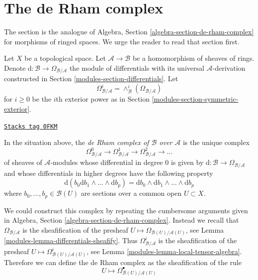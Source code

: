 \section{The de Rham complex}
\label{modules-section-de-rham-complex}
The section is the analogue of
Algebra, Section \ref{algebra-section-de-rham-complex} for morphisms of ringed
spaces. We urge the reader to read that section first.

\medskip\noindent
Let $X$ be a topological space. Let $\mathcal{A} \to \mathcal{B}$ be a
homomorphism of sheaves of rings. Denote
$\text{d} : \mathcal{B} \to \Omega_{\mathcal{B}/\mathcal{A}}$
the module of differentials with its universal $\mathcal{A}$-derivation
constructed in Section \ref{modules-section-differentials}.
Let
$$
\Omega_{\mathcal{B}/\mathcal{A}}^i =
\wedge^i_\mathcal{B}(\Omega_{\mathcal{B}/\mathcal{A}})
$$
for $i \geq 0$ be the $i$th exterior power as in
Section \ref{modules-section-symmetric-exterior}.

\begin{definition}
\label{modules-definition-de-rham-complex}
\href{https://stacks.math.columbia.edu/tag/0FKM}{\texttt{Stacks tag 0FKM}}

In the situation above, the
{\it de Rham complex of $\mathcal{B}$ over $\mathcal{A}$}
is the unique complex
$$
\Omega_{\mathcal{B}/\mathcal{A}}^0 \to
\Omega_{\mathcal{B}/\mathcal{A}}^1 \to
\Omega_{\mathcal{B}/\mathcal{A}}^2 \to \ldots
$$
of sheaves of $\mathcal{A}$-modules whose differential in degree
$0$ is given by $\text{d} : \mathcal{B} \to \Omega_{\mathcal{B}/\mathcal{A}}$
and whose differentials in higher degrees have the following property
\begin{equation}
\label{equation-rule}
\text{d}\left(b_0\text{d}b_1 \wedge \ldots \wedge \text{d}b_p\right) =
\text{d}b_0 \wedge \text{d}b_1 \wedge \ldots \wedge \text{d}b_p
\end{equation}
where $b_0, \ldots, b_p \in \mathcal{B}(U)$ are sections over a common
open $U \subset X$.
\end{definition}

We could construct this complex by repeating the cumbersome arguments
given in Algebra, Section \ref{algebra-section-de-rham-complex}.
Instead we recall that $\Omega_{\mathcal{B}/\mathcal{A}}$ is the
sheafification of the presheaf
$U \mapsto \Omega_{\mathcal{B}(U)/\mathcal{A}(U)}$, see
Lemma \ref{modules-lemma-differentials-sheafify}.
Thus $\Omega_{\mathcal{B}/\mathcal{A}}^i$ is the sheafification of
the presheaf
$U \mapsto \Omega^i_{\mathcal{B}(U)/\mathcal{A}(U)}$, see
Lemma \ref{modules-lemma-local-tensor-algebra}.
Therefore we can define the de Rham complex
as the sheafification of the rule
$$
U \longmapsto
\Omega^\bullet_{\mathcal{B}(U)/\mathcal{A}(U)}
$$


